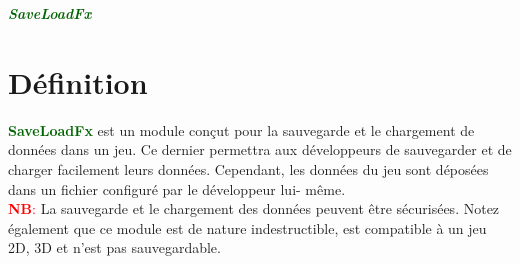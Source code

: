 \documentclass[a4paper, 11pt]{article}
\begin{document}
	\pagecolor{silver}
	\huge{\hspace{14.5cm}\textit{\textbf{\textcolor{darkgreen}{SaveLoadFx}}}}\large{} \tableofcontents 
	\newpage
	\section{Définition}
	\textcolor{darkgreen}{\textbf{SaveLoadFx}} est un module conçut pour la sauvegarde et le chargement de 
	données dans un jeu. Ce dernier permettra aux développeurs de sauvegarder et de charger facilement leurs 
	données. Cependant, les données du jeu sont déposées dans un fichier configuré par le développeur lui-
	même.\\
	\textcolor{red}{\textbf{NB}:} La sauvegarde et le chargement des données peuvent être sécurisées. Notez
	également que ce module est de nature indestructible, est compatible à un jeu 2D, 3D et n'est pas 
	sauvegardable.

\end{document}
